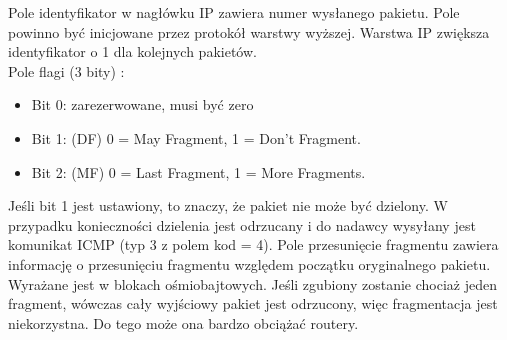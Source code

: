 \documentclass[../main.tex]{subfiles}
\begin{document}
    Pole identyfikator w nagłówku IP zawiera numer wysłanego pakietu. Pole powinno być inicjowane przez protokół warstwy wyższej. Warstwa IP zwiększa identyfikator
    o 1 dla kolejnych pakietów.\\
    Pole flagi (3 bity) :
    \begin{itemize}
        \item Bit 0: zarezerwowane, musi być zero
        \item Bit 1: (DF) 0 = May Fragment, 1 = Don't Fragment.
        \item Bit 2: (MF) 0 = Last Fragment, 1 = More Fragments.
    \end{itemize}
    Jeśli bit 1 jest ustawiony, to znaczy, że pakiet nie może być dzielony. W przypadku konieczności dzielenia jest odrzucany i do nadawcy wysyłany jest
    komunikat ICMP (typ 3 z polem kod = 4).
    Pole przesunięcie fragmentu zawiera informację o przesunięciu fragmentu względem początku oryginalnego pakietu. Wyrażane jest w blokach ośmiobajtowych.
    Jeśli zgubiony zostanie chociaż jeden fragment, wówczas cały wyjściowy pakiet jest odrzucony, więc fragmentacja jest niekorzystna.
    Do tego może ona bardzo obciążać routery.
\end{document}
